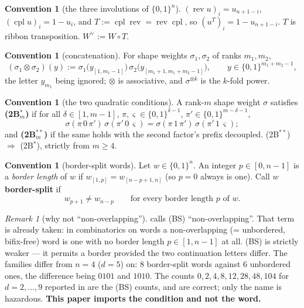 \documentclass[11pt]{article}
\theoremstyle{definition}
\newtheorem{convention}[theorem]{Convention}
\theoremstyle{remark}
\newtheorem{remark}[theorem]{Remark}
\newcommand{\cube}{\{0,1\}}
\newcommand{\rev}{\operatorname{rev}}
\newcommand{\cpl}{\operatorname{cpl}}
\begin{document}
\begin{convention}[the three involutions of $\cube^{n}$]\label{conv:invol}
$(\rev u)_i=u_{n+1-i}$, $(\cpl u)_i=1-u_i$, and $T:=\cpl\rev=\rev\cpl$, so
$(u^{T})_i=1-u_{n+1-i}$.  $T$ is ribbon transposition.  $W^{\vee}:=W\circ T$.
\end{convention}

\begin{convention}[concatenation]\label{conv:otimes}
For shape weights $\sigma_1,\sigma_2$ of ranks $m_1,m_2$,
\[
  (\sigma_1\otimes\sigma_2)(y):=\sigma_1\bigl(y_{[1,m_1-1]}\bigr)\,
       \sigma_2\bigl(y_{[m_1+1,m_1+m_2-1]}\bigr),\qquad y\in\cube^{m_1+m_2-1},
\]
the letter $y_{m_1}$ being ignored; $\otimes$ is associative, and $\sigma^{\otimes k}$ is the
$k$-fold power.
\end{convention}

\begin{convention}[the two quadratic conditions]\label{conv:2B}
A rank-$m$ shape weight $\sigma$ satisfies \textbf{(2B$^{*}_m$)} if for all
$\delta\in[1,m-1]$, $\pi,\varsigma\in\cube^{\delta-1}$, $\pi'\in\cube^{m-\delta-1}$,
\[
   \sigma(\pi\,0\,\pi')\,\sigma(\pi'\,0\,\varsigma)=\sigma(\pi\,1\,\pi')\,\sigma(\pi'\,1\,\varsigma);
\]
and \textbf{(2B$^{**}_m$)} if the same holds with the second factor's prefix decoupled.
(2B$^{**}$) $\Rightarrow$ (2B$^{*}$), strictly from $m\ge4$.
\end{convention}

\begin{convention}[border-split words]\label{conv:BS}
Let $w\in\cube^{n}$.  An integer $p\in[0,n-1]$ is a \emph{border length} of $w$ if
$w_{[1,p]}=w_{[n-p+1,n]}$ (so $p=0$ always is one).  Call $w$ \textbf{border-split} if
\[
   w_{p+1}\ne w_{n-p}\qquad\text{for every border length }p\text{ of }w. \tag{BS}
\]
\end{convention}

\begin{remark}[why not ``non-overlapping'']\label{rem:noname}
\cite{Q150c2} calls (BS) ``non-overlapping''.  That term is already taken: in combinatorics on
words a non-overlapping (= unbordered, bifix-free) word is one with no border length
$p\in[1,n-1]$ at all.  (BS) is strictly weaker --- it permits a border provided the two
continuation letters differ.  The families differ from $n=4$ ($d=5$) on: $8$ border-split
words against $6$ unbordered ones, the difference being $0101$ and $1010$.  The counts
$0,2,4,8,12,28,48,104$ for $d=2,\dots,9$ reported in \cite[\S9]{Q150c2} are the (BS) counts,
and are correct; only the name is hazardous.  \textbf{This paper imports the condition and not
the word.}
\end{remark}
\end{document}
